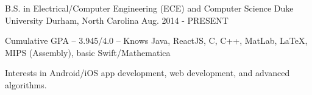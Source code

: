 \begin{cventries}
  \cventry
    {B.S. in Electrical/Computer Engineering (ECE) and Computer Science}
    {Duke University}
    {Durham, North Carolina}
    {Aug. 2014 - PRESENT}
    {
      \begin{cvitems}
        \item {Cumulative GPA -- 3.945/4.0 -- Knows Java, ReactJS, C, C++, MatLab, LaTeX, MIPS (Assembly), basic Swift/Mathematica}
        \item {Interests in Android/iOS app development, web development, and advanced algorithms.}
      \end{cvitems}
    }
\end{cventries}
